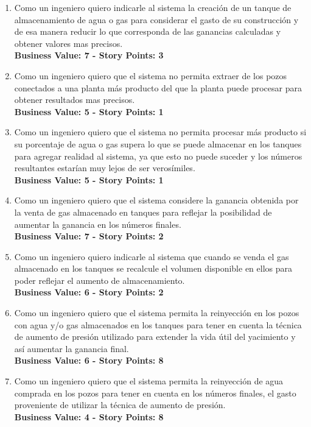 \begin{enumerate}
  \item Como un ingeniero quiero indicarle al sistema la creación de un tanque de almacenamiento de agua o gas para considerar el gasto de su construcción y de esa manera reducir lo que corresponda de las ganancias calculadas y obtener valores mas precisos.\\
  \textbf{Business Value: 7 - Story Points: 3}
  
  \item Como un ingeniero quiero que el sistema no permita extraer de los pozos conectados a una planta más producto del que la planta puede procesar para obtener resultados mas precisos.\\
  \textbf{Business Value: 5 - Story Points: 1}
  
  \item Como un ingeniero quiero que el sistema no permita procesar más producto si su porcentaje de agua o gas supera lo que se puede almacenar en los tanques para agregar realidad al sistema, ya que esto no puede suceder y los números resultantes estarían muy lejos de ser verosímiles.\\
  \textbf{Business Value: 5 - Story Points: 1}
  
  \item Como un ingeniero quiero que el sistema considere la ganancia obtenida por la venta de gas almacenado en tanques para reflejar la posibilidad de aumentar la ganancia en los números finales.\\
  \textbf{Business Value: 7 - Story Points: 2}
  
  \item Como un ingeniero quiero indicarle al sistema que cuando se venda el gas almacenado en los tanques se recalcule el volumen disponible en ellos para poder reflejar el aumento de almacenamiento.\\
  \textbf{Business Value: 6 - Story Points: 2}
   
  \item Como un ingeniero quiero que el sistema permita la reinyección en los pozos con agua y/o gas almacenados en los tanques para tener en cuenta la técnica de aumento de presión utilizado para extender la vida útil del yacimiento y así aumentar la ganancia final.\\
  \textbf{Business Value: 6 - Story Points: 8}
  
  \item Como un ingeniero quiero que el sistema permita la reinyección de agua comprada en los pozos para tener en cuenta en los números finales, el gasto proveniente de utilizar la técnica de aumento de presión.\\
  \textbf{Business Value: 4 - Story Points: 8}
  

\end{enumerate}
